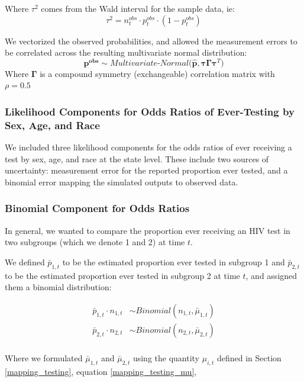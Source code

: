 \documentclass{article}
\begin{document}
Where $\tau^2$ comes from the Wald interval for the sample data, ie:
\begin{equation}
	\tau^2 = n^{obs}_t \cdot p^{obs}_t \cdot (1-p^{obs}_t)
\end{equation}

We vectorized the observed probabilities, and allowed the measurement errors to be correlated across the resulting multivariate normal distribution:
\begin{equation}
	\bm{p^{obs}} \sim Multivariate\text{-}Normal\big(\bm{\hat{p}}, \bm{\tau} \bm{\Gamma} \bm{\tau}^T \big)
\end{equation}
Where $\bm{\Gamma}$ is a compound symmetry (exchangeable) correlation matrix with $\rho = 0.5$

\subsubsection{Likelihood Components for Odds Ratios of Ever-Testing by Sex, Age, and Race}
We included three likelihood components for the odds ratios of ever receiving a test by sex, age, and race at the state level. These include two sources of uncertainty: measurement error for the reported proportion ever tested, and a binomial error mapping the simulated outputs to observed data.

\subsubsection{Binomial Component for Odds Ratios}

In general, we wanted to compare the proportion ever receiving an HIV test in two subgroups (which we denote 1 and 2) at time $t$.

We defined $\bar{p}_{1,t}$ to be the estimated proportion ever tested in subgroup 1 and $\bar{p}_{2,t}$ to be the estimated proportion ever tested in subgroup 2 at time $t$, and assigned them a binomial distribution:

\begin{align}
	\bar{p}_{1,t} \cdot n_{1,t} &\sim Binomial(n_{1,t}, \bar{\mu}_{1,t}) \\
	\bar{p}_{2,t} \cdot n_{2,t} &\sim Binomial(n_{2,t}, \bar{\mu}_{2,t}) \\
\end{align}

Where we formulated $\bar{\mu}_{1,t}$ and $\bar{\mu}_{2,t}$ using the quantity $\mu_{i,t}$ defined in Section \ref{mapping_testing}, equation \ref{mapping_testing_mu}, 
\end{document}
